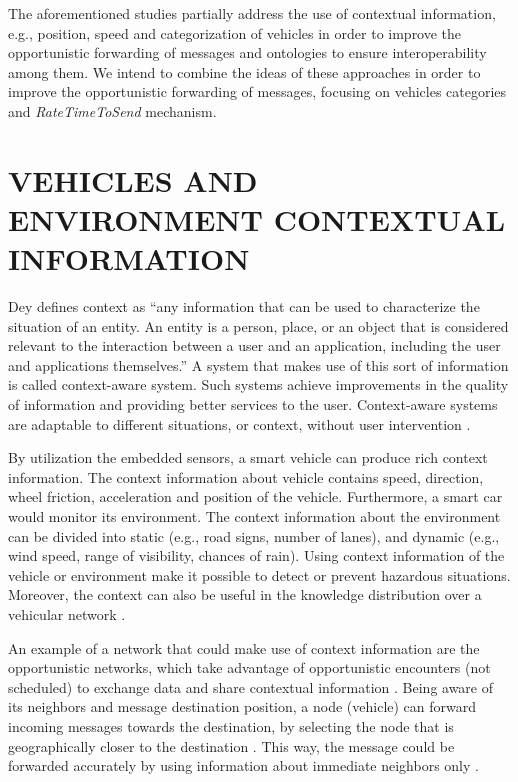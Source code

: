 \documentclass[letterpaper, 10 pt, conference]{ieeeconf}  %
\begin{document}
The aforementioned studies partially address the use of contextual information, e.g., position, speed and categorization of vehicles in order to improve the opportunistic forwarding of messages and ontologies to ensure interoperability among them. We intend to combine the ideas of these approaches in order to improve the opportunistic forwarding of messages, focusing on vehicles categories and \emph{RateTimeToSend} mechanism.

\section{VEHICLES AND ENVIRONMENT CONTEXTUAL INFORMATION}

Dey \cite{dey2001} defines context as “any information that can be used to characterize the situation of an entity. An entity is a person, place, or an object that is considered relevant to the interaction between a user and an application, including the user and applications themselves.” A system that makes use of this sort of information is called context-aware system. Such systems achieve improvements in the quality of information and providing better services to the user. Context-aware systems are adaptable to  different situations, or context, without user intervention \cite{baldauf2007}.

By utilization the embedded sensors, a smart vehicle can produce rich context information. The context information about vehicle contains speed, direction, wheel friction, acceleration and position of the vehicle. Furthermore, a smart car would monitor its environment. The context information about the environment can be divided into static (e.g., road signs, number of lanes), and dynamic (e.g., wind speed, range of visibility, chances of rain). Using context information of the vehicle or environment make it possible to detect or prevent hazardous situations. Moreover, the context can also be useful in the knowledge distribution over a vehicular network \cite{tocadas2010}.

An example of a network that could make use of context information are the opportunistic networks, which take advantage of opportunistic encounters (not scheduled) to exchange data and share contextual information  \cite{geoopp2014}. Being aware of its neighbors and message destination position, a node (vehicle) can forward incoming messages towards the destination, by selecting the node that is geographically closer to the destination \cite{gpsr2000}. This way, the message could be forwarded accurately by using information about immediate neighbors only \cite{magf2009}.
\end{document}
